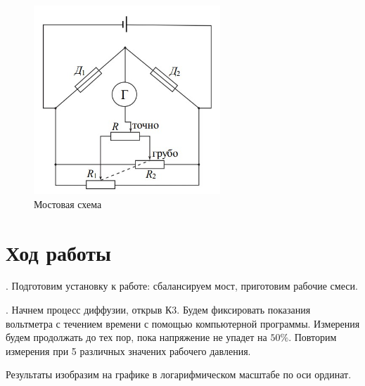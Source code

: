 \documentclass[a4paper,12pt]{article} %
\begin{document}
\begin{figure}[h]
	\begin{center}
		\includegraphics[width=7cm]{мост.jpg}
	\end{center}
	\caption{Мостовая схема}
\end{figure}

\section{Ход работы}

\medskip

. Подготовим установку к работе: сбалансируем мост, приготовим рабочие смеси.

\medskip

. Начнем процесс диффузии, открыв К3. Будем фиксировать показания вольтметра с течением времени с помощью компьютерной программы. Измерения будем продолжать до тех пор, пока напряжение не упадет на $50\%$. Повторим измерения при 5 различных значених рабочего давления.

\medskip

\noindent Результаты изобразим на графике в логарифмическом масштабе по оси ординат.

\medskip

\begin{figure}[h!]	
\end{figure}
	
\end{document}

